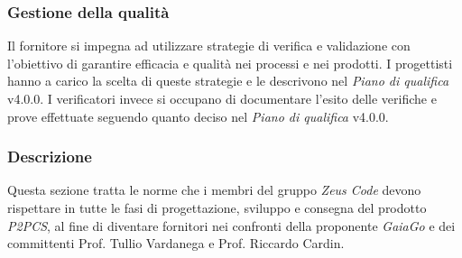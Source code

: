 	\subsubsection{Gestione della qualità}
	Il fornitore si impegna ad utilizzare strategie di verifica e validazione con l'obiettivo di garantire efficacia e qualità nei processi e nei prodotti. I progettisti hanno a carico la scelta di queste strategie e le descrivono nel \textit{Piano di qualifica} v4.0.0. I verificatori invece si occupano di documentare l'esito delle verifiche e prove effettuate seguendo quanto deciso nel \textit{Piano di qualifica} v4.0.0.
	\subsubsection{Descrizione}
	Questa sezione tratta le norme che i membri del gruppo \textit{Zeus Code} devono rispettare in tutte le fasi di progettazione, sviluppo e consegna del prodotto \textit{P2PCS}, al fine di diventare fornitori nei confronti della proponente \textit{GaiaGo} e dei committenti Prof. Tullio Vardanega e Prof. Riccardo Cardin.

